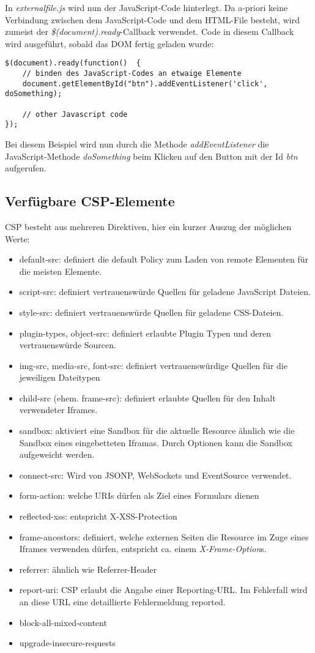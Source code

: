 In \textit{externalfile.js} wird nun der JavaScript-Code hinterlegt. Da a-priori keine Verbindung zwischen dem JavaScript-Code und dem HTML-File besteht, wird zumeist der \textit{\$(document).ready}-Callback verwendet. Code in diesem Callback wird ausgeführt, sobald das DOM fertig geladen wurde:

\begin{verbatim}
$(document).ready(function()  {
	// binden des JavaScript-Codes an etwaige Elemente
	document.getElementById("btn").addEventListener('click', doSomething);

	// other Javascript code
});
\end{verbatim}

Bei diesem Beispiel wird nun durch die Methode \textit{addEventListener} die JavaScript-Methode \textit{doSomething} beim Klicken auf den Button mit der Id \textit{btn} aufgerufen.

\subsection{Verfügbare CSP-Elemente}

CSP besteht aus mehreren Direktiven, hier ein kurzer Auszug der möglichen Werte:

\begin{itemize}
	\item default-src: definiert die default Policy zum Laden von remote Elementen für die meisten Elemente.
	\item script-src: definiert vertrauenswürde Quellen für geladene JavaScript Dateien.
	\item style-src: definiert vertrauenswürde Quellen für geladene CSS-Dateien.
	\item plugin-types, object-src: definiert erlaubte Plugin Typen und deren vertrauenswürde Sourcen.
	\item img-src, media-src, font-src: definiert vertrauenswürdige Quellen für die jeweiligen Dateitypen
	\item child-src (ehem. frame-src): definiert erlaubte Quellen für den Inhalt verwendeter Iframes.
	\item sandbox: aktiviert eine Sandbox für die aktuelle Resource ähnlich wie die Sandbox eines eingebetteten Iframas. Durch Optionen kann die Sandbox aufgeweicht werden.
	\item connect-src: Wird von JSONP, WebSockets und EventSource verwendet.
	\item form-action: welche URIs dürfen als Ziel eines Formulars dienen
	\item reflected-xss: entspricht X-XSS-Protection
	\item frame-ancestors: definiert, welche externen Seiten die Resource im Zuge eines Iframes verwenden dürfen, entspricht ca. einem \textit{X-Frame-Option}s.
	\item referrer: ähnlich wie Referrer-Header
	\item report-uri: CSP erlaubt die Angabe einer Reporting-URL. Im Fehlerfall wird an diese URL eine detaillierte Fehlermeldung reported.
	\item block-all-mixed-content
	\item upgrade-insecure-requests
\end{itemize}

